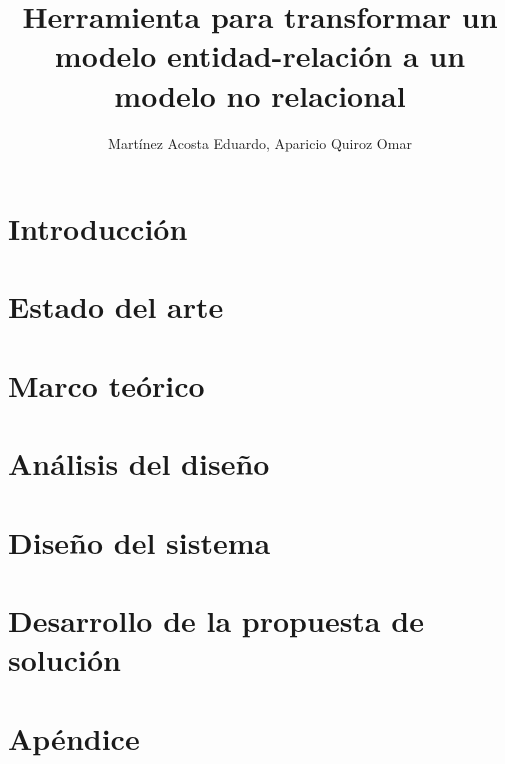 \documentclass[12pt, a4paper]{report}
\title{Herramienta para transformar un modelo entidad-relación a un modelo no relacional}
\author{Martínez Acosta Eduardo, Aparicio Quiroz Omar}
\theoremstyle{definition}
\theoremstyle{remark}
\begin{document}

\tableofcontents
\listoffigures
\listoftables


\chapter{Introducción}

\chapter{Estado del arte}

\chapter{Marco teórico}

\chapter{Análisis del diseño}

\chapter{Diseño del sistema}

\chapter{Desarrollo de la propuesta de solución}

\appendix
\chapter{Apéndice}

\printbibliography
\end{document}
